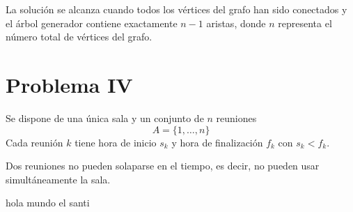 \documentclass[12pt]{article}
\begin{document}
	La solución se alcanza cuando todos los vértices del grafo han sido conectados y el árbol generador contiene exactamente \(n-1\) aristas, donde \(n\) representa el número total de vértices del grafo.

	\section*{Problema IV}
	
	Se dispone de una única sala y un conjunto de \(n\) reuniones 
	\[A = \{1,\ldots,n\}\] Cada reunión \(k\) tiene hora de inicio \(s_k\) y hora de finalización \(f_k\) con \(s_k < f_k\).
	
	Dos reuniones no pueden solaparse en el tiempo, es decir, no pueden usar simultáneamente la sala.

	hola mundo el santi


	
	 
\end{document}
